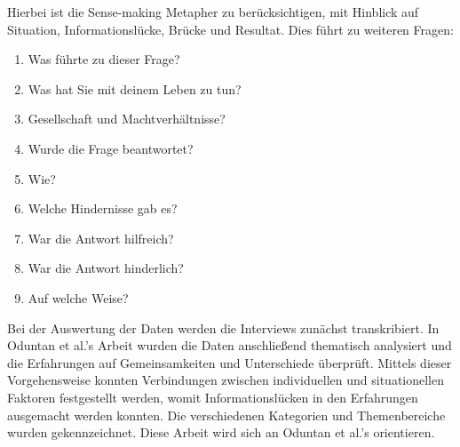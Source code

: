 \documentclass[12pt,oneside]{article}
\begin{document}
Hierbei ist die Sense-making Metapher zu ber\"ucksichtigen, mit Hinblick auf Situation, Informationsl\"ucke, Br\"ucke und Resultat.\cite{dervin2003sense}\newline
Dies f\"uhrt zu weiteren Fragen:\newline
\begin{enumerate}
    \item Was f\"uhrte zu dieser Frage?
    \item Was hat Sie mit deinem Leben zu tun?
    \item Gesellschaft und Machtverh\"altnisse?
    \item Wurde die Frage beantwortet?
    \item Wie?
    \item Welche Hindernisse gab es?
    \item War die Antwort hilfreich?
    \item War die Antwort hinderlich?
    \item Auf welche Weise?
\end{enumerate}
\newline
Bei der Auswertung der Daten werden die Interviews zun\"achst transkribiert. In Oduntan et al.'s Arbeit wurden die Daten anschlie\ss{}end thematisch analysiert und die Erfahrungen auf Gemeinsamkeiten und Unterschiede \"uberpr\"uft. Mittels dieser Vorgehensweise konnten Verbindungen zwischen individuellen und situationellen Faktoren festgestellt werden, womit Informationsl\"ucken in den Erfahrungen ausgemacht werden konnten. Die verschiedenen Kategorien und Themenbereiche wurden gekennzeichnet.\cite{oduntan2017investigating} Diese Arbeit wird sich an Oduntan et al.'s orientieren.



\end{document}
